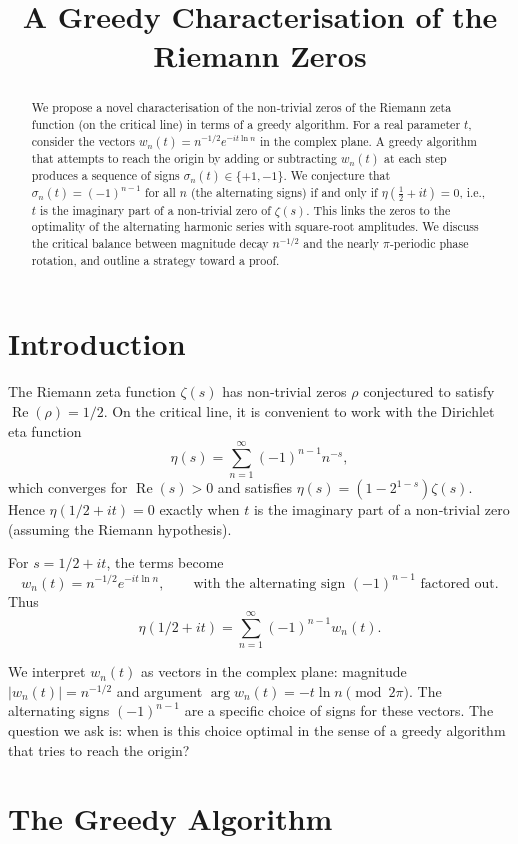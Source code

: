 \documentclass[12pt,a4paper]{article}
\title{A Greedy Characterisation of the Riemann Zeros}
\author{}
\date{}
\begin{document}
\maketitle

\begin{abstract}
We propose a novel characterisation of the non‑trivial zeros of the Riemann zeta function (on the critical line) in terms of a greedy algorithm. For a real parameter $t$, consider the vectors $w_n(t)=n^{-1/2}e^{-it\ln n}$ in the complex plane. A greedy algorithm that attempts to reach the origin by adding or subtracting $w_n(t)$ at each step produces a sequence of signs $\sigma_n(t)\in\{+1,-1\}$. We conjecture that $\sigma_n(t)=(-1)^{n-1}$ for all $n$ (the alternating signs) if and only if $\eta(\frac12+it)=0$, i.e., $t$ is the imaginary part of a non‑trivial zero of $\zeta(s)$. This links the zeros to the optimality of the alternating harmonic series with square‑root amplitudes. We discuss the critical balance between magnitude decay $n^{-1/2}$ and the nearly $\pi$‑periodic phase rotation, and outline a strategy toward a proof.
\end{abstract}

\section{Introduction}

The Riemann zeta function $\zeta(s)$ has non‑trivial zeros $\rho$ conjectured to satisfy $\operatorname{Re}(\rho)=1/2$. On the critical line, it is convenient to work with the Dirichlet eta function
\[
\eta(s)=\sum_{n=1}^{\infty}(-1)^{n-1}n^{-s},
\]
which converges for $\operatorname{Re}(s)>0$ and satisfies $\eta(s)=(1-2^{1-s})\zeta(s)$. Hence $\eta(1/2+it)=0$ exactly when $t$ is the imaginary part of a non‑trivial zero (assuming the Riemann hypothesis).

For $s=1/2+it$, the terms become
\[
w_n(t)=n^{-1/2}e^{-it\ln n},\qquad\text{with the alternating sign }(-1)^{n-1}\text{ factored out.}
\]
Thus
\[
\eta(1/2+it)=\sum_{n=1}^{\infty}(-1)^{n-1}w_n(t).
\]

We interpret $w_n(t)$ as vectors in the complex plane: magnitude $|w_n(t)|=n^{-1/2}$ and argument $\arg w_n(t)=-t\ln n\pmod{2\pi}$. The alternating signs $(-1)^{n-1}$ are a specific choice of signs for these vectors. The question we ask is: when is this choice optimal in the sense of a greedy algorithm that tries to reach the origin?

\section{The Greedy Algorithm}
\end{document}
